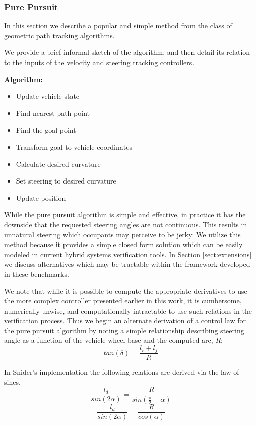 \subsubsection{Pure Pursuit}
\label{sect:pure-pursuit}
In this section we describe a popular and simple method from the class of geometric path tracking algorithms. 

We provide a brief informal sketch of the algorithm, and then detail its relation to the inputs of the velocity and steering tracking controllers.

\textbf{Algorithm:}
\begin{itemize}
	\item Update vehicle state
	\item Find nearest path point
	\item Find the goal point
	\item Transform goal to vehicle coordinates
	\item Calculate desired curvature
	\item Set steering to desired curvature
	\item Update position
\end{itemize}

While the pure pursuit algorithm is simple and effective, in practice it has the downside that the requested steering angles are not continuous. This results in unnatural steering which occupants may perceive to be jerky. We utilize this method because it provides a simple closed form solution which can be easily modeled in current hybrid systems verification tools. In Section \ref{sect:extensions} we discuss alternatives which may be tractable within the framework developed in these benchmarks.

We note that while it is possible to compute the appropriate derivatives to use the more complex controller presented earlier in this work, it is cumbersome, numerically unwise, and computationally intractable to use such relations in the verification process. Thus we begin an alternate derivation of a control law for the pure pursuit algorithm by noting a simple relationship describing steering angle as a function of the vehicle wheel base and the computed arc, $R$:
\begin{equation}
	tan(\delta) = \frac{l_r+l_f}{R}
\end{equation}

In Snider's implementation \cite{Snider2009} the following relations are derived via the law of sines.
\begin{equation}
	\frac{l_d}{sin(2\alpha)} = \frac{R}{sin(\frac{\pi}{2} - \alpha)}
\end{equation}
\begin{equation}
	\frac{l_d}{sin(2\alpha)} = \frac{R}{cos(\alpha)}
\end{equation}

